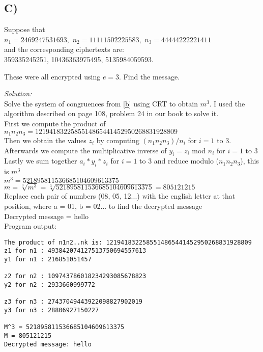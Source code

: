 \documentclass{article}
\begin{document}
\newpage
\subsection{C)}
Suppose that\\
$n_{1} = 2469247531693,$ $n_{2} = 11111502225583,$ $n_{3} = 44444222221411$\\
and the corresponding ciphertexts are:\\
359335245251, 10436363975495, 5135984059593.

These were all encrypted using $e = 3$. Find the message.

\emph{Solution:}\\
Solve the system of congruences from \ref{b} using CRT to obtain $m^{3}$. I used the algorithm described on page 108, problem 24 in our book to solve it.\\
First we compute the product of $n_{1}n_{2}n_{3} = 1219418322585514865441452950268831928809$\\
Then we obtain the values $z_{i}$ by computing $(n_{1}n_{2}n_{3})/n_{i}$ for $i=1$ to 3.\\
Afterwards we compute the multiplicative inverse of $y_{i} = z_{i}$ mod $n_{i}$ for $i=1$ to 3\\
Lastly we sum together $a_{i}*y_{i}*z_{i}$ for $i=1$ to 3 and reduce modulo ($n_{1}n_{2}n_{3}$), this is $m^{3}$\\
$m^{3} = 521895811536685104609613375$\\
$m = \sqrt[3]{m^{3}} = \sqrt[3]{521895811536685104609613375} = 805121215$\\
Replace each pair of numbers (08, 05, 12...) with the english letter at that position, where a = 01, b = 02... to find the decrypted message\\
Decrypted message = hello\\

Program output:
\begin{verbatim}
The product of n1n2..nk is: 1219418322585514865441452950268831928809
z1 for n1 : 493842074127513750694557613
y1 for n1 : 216851051457

z2 for n2 : 109743786018234293085678823
y2 for n2 : 2933660999772

z3 for n3 : 27437049443922098827902019
y3 for n3 : 28806927150227

M^3 = 521895811536685104609613375
M = 805121215
Decrypted message: hello

\end{verbatim}
\end{document}
